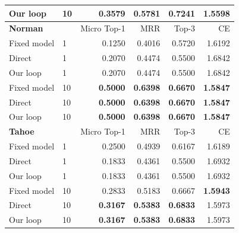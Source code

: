 \begin{longtable}{llrrrr}
Our loop & 10 & \textbf{0.3579} & \textbf{0.5781} & \textbf{0.7241} & \textbf{1.5598} \\
\midrule
\multicolumn{2}{l}{\textbf{Norman}} & Micro Top-1 & MRR & Top-3 & CE \\
Fixed model & 1 & 0.1250 & 0.4016 & 0.5720 & 1.6192 \\
Direct & 1 & 0.2070 & 0.4474 & 0.5500 & 1.6842 \\
Our loop & 1 & 0.2070 & 0.4474 & 0.5500 & 1.6842 \\
Fixed model & 10 & \textbf{0.5000} & \textbf{0.6398} & \textbf{0.6670} & \textbf{1.5847} \\
Direct & 10 & \textbf{0.5000} & \textbf{0.6398} & \textbf{0.6670} & \textbf{1.5847} \\
Our loop & 10 & \textbf{0.5000} & \textbf{0.6398} & \textbf{0.6670} & \textbf{1.5847} \\
\midrule
\multicolumn{2}{l}{\textbf{Tahoe}} & Micro Top-1 & MRR & Top-3 & CE \\
Fixed model & 1 & 0.2500 & 0.4939 & 0.6167 & 1.6189 \\
Direct & 1 & 0.1833 & 0.4361 & 0.5500 & 1.6932 \\
Our loop & 1 & 0.1833 & 0.4361 & 0.5500 & 1.6932 \\
Fixed model & 10 & 0.2833 & 0.5183 & 0.6667 & \textbf{1.5943} \\
Direct & 10 & \textbf{0.3167} & \textbf{0.5383} & \textbf{0.6833} & 1.5973 \\
Our loop & 10 & \textbf{0.3167} & \textbf{0.5383} & \textbf{0.6833} & 1.5973 \\
\midrule
\bottomrule
\end{longtable}

